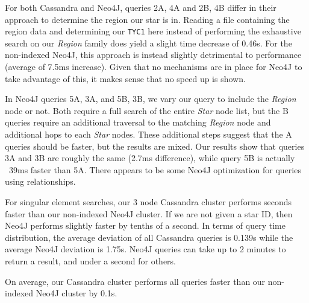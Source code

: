 For both Cassandra and Neo4J, queries 2A, 4A and 2B, 4B differ in their approach to determine the region our star is in.
Reading a file containing the region data and determining our \texttt{TYC1} here instead of performing the exhaustive
search on our \textit{Region} family does yield a slight time decrease of 0.46s.
For the non-indexed Neo4J, this approach is instead slightly detrimental to performance (average of 7.5ms increase).
Given that no mechanisms are in place for Neo4J to take advantage of this, it makes sense that no speed up is shown.

In Neo4J queries 5A, 3A, and 5B, 3B, we vary our query to include the \textit{Region} node or not.
Both require a full search of the entire \textit{Star} node list, but the B queries require an additional traversal
to the matching \textit{Region} node and additional hops to each \textit{Star} nodes.
These additional steps suggest that the A queries should be faster, but the results are mixed.
Our results show that queries 3A and 3B are roughly the same (2.7ms difference), while query 5B is actually ~39ms
faster than 5A\@.
There appears to be some Neo4J optimization for queries using relationships.

For singular element searches, our 3 node Cassandra cluster performs seconds faster than our non-indexed Neo4J cluster.
If we are not given a star ID, then Neo4J performs slightly faster by tenths of a second.
In terms of query time distribution, the average deviation of all Cassandra queries is 0.139s while
the average Neo4J deviation is 1.75s.
Neo4J queries can take up to 2 minutes to return a result, and under a second for others.


On average, our Cassandra cluster performs all queries faster than our non-indexed Neo4J cluster by 0.1s.

